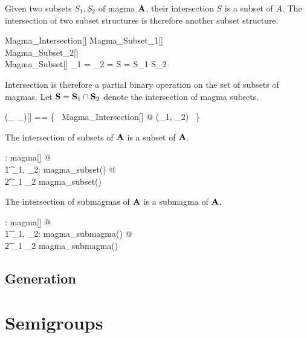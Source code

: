 \documentclass{amsart}
\begin{document}
Given two subsets $S_1, S_2$ of magma $\mathbf{A}$, their intersection $S$ is a subset
of $A$. The intersection of two subset structures is therefore another subset structure.

\begin{schema}{Magma\_Intersection}[\genT]
	Magma\_Subset_1[\genT] \\
	Magma\_Subset_2[\genT] \\
	Magma\_Subset[\genT]
\where
	\strucA_1 = \strucA_2 = \strucA
\also
	S = S_1 \cap S_2
\end{schema}

Intersection is therefore a partial binary operation on the set of subsets of magmas.
Let $\mathbf{S} = \mathbf{S}_1 \mathbin{\cap} \mathbf{S}_2$ denote the intersection of magma subsets.

\begin{zed}
	(\_ \capMagma \_)[\genT] == \{~ Magma\_Intersection[\genT] @ (\strucS_1, \strucS_2) \mapsto \strucS ~\}
\end{zed}

\begin{remark}
The intersection of subsets of $\mathbf{A}$ is a subset of $\mathbf{A}$.

\begin{zed}
	\forall \strucA: magma[\setT] @ \\
	\t1	\forall \strucS_1, \strucS_2: magma\_subset(\strucA) @ \\
	\t2		\strucS_1 \capMagma \strucS_2 \in magma\_subset(\strucA)
\end{zed}

\end{remark}

\begin{remark}
The intersection of submagmas of $\mathbf{A}$ is a submagma of $\mathbf{A}$.

\begin{zed}
	\forall \strucA: magma[\setT] @ \\
	\t1	\forall \strucS_1, \strucS_2: magma\_submagma(\strucA) @ \\
	\t2		\strucS_1 \capMagma \strucS_2 \in magma\_submagma(\strucA)
\end{zed}

\end{remark}

\subsection{Generation}

\section{Semigroups}
\end{document}
